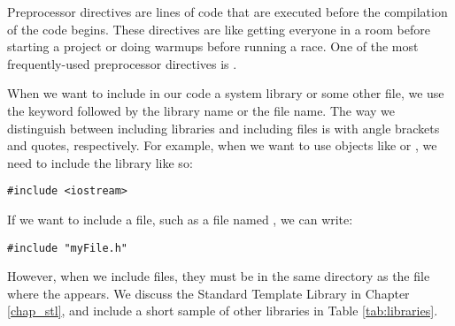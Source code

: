 
Preprocessor directives are lines of code that are executed before the compilation of the code begins. 
These directives are like getting everyone in a room before starting a project or doing warmups before running a race. 
One of the most frequently-used preprocessor directives is .

When we want to include in our code a system library or some other file, we use the keyword  followed by the library name or the file name. 
The way we distinguish between including libraries and including files is with angle brackets and quotes, respectively. 
For example, when we want to use objects like  or , we need to include the  library like so: 

\noindent\begin{minipage}{\linewidth}\begin{lstlisting}
#include <iostream> 
\end{lstlisting}\end{minipage}

If we want to include a file, such as a file named , we can write: 

\noindent\begin{minipage}{\linewidth}\begin{lstlisting}
#include "myFile.h"
\end{lstlisting}\end{minipage}

However, when we include files, they must be in the same directory as the file where the  appears. 
We discuss the Standard Template Library in Chapter \ref{chap_stl}, and include a short sample of other libraries in Table \ref{tab:libraries}.

